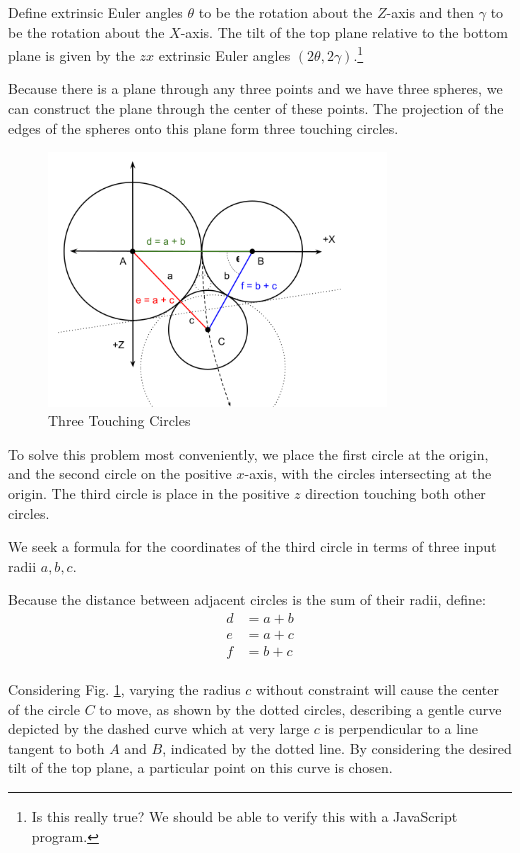 \documentclass{article}
\begin{document}
Define extrinsic Euler angles $\theta$ to be the rotation about the $Z$-axis and then $\gamma$ to
be the rotation about the $X$-axis.
The tilt of the top plane relative
to the bottom plane is given by the $zx$ extrinsic Euler angles $(2\theta, 2\gamma)$.\footnote{Is this really true?
We should be able to verify this with a JavaScript program.}

Because there is a plane through any three points and we have three spheres, we can construct the plane through
the center of these points.
The projection of the edges of the spheres onto this plane form three touching circles.

\begin{figure}
     \centering
     \includegraphics[width=0.8\textwidth]{figures/ThreeTouchingPlanarCircles.png}
     \caption{Three Touching Circles}
  \label{fig:Tangent}
\end{figure}

To solve this problem most conveniently, we place the first circle at the origin, and the second circle
on the positive $x$-axis, with the circles intersecting at the origin.
The third circle is place in the positive $z$ direction touching both other circles.

We seek a formula for the coordinates of the third circle in terms of three input radii $a,b,c$.

Because the distance between adjacent circles is the sum of their radii, define:
\begin{align}
  d  &= a + b \\
  e  &= a + c \\
  f  &= b + c \\
\end{align}

Considering Fig. \ref{fig:Tangent}, varying the radius $c$ without constraint will cause
the center of the circle $C$ to move, as shown by the dotted circles,
describing a gentle curve depicted by the dashed curve which at very large $c$ is perpendicular to a
line tangent to both $A$ and $B$, indicated by the dotted line.
By considering the desired tilt of the top plane,
a particular point on this curve is chosen.
\end{document}
